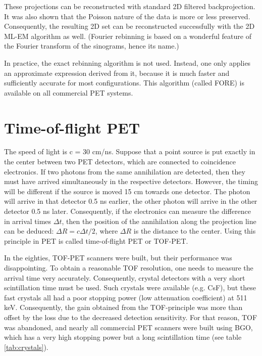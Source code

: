\documentclass[11pt,oneside]{book}
\begin{document}
These projections can be reconstructed with standard 2D filtered
backprojection.  It was also shown that the Poisson nature of the data
is more or less preserved.  Consequently, the resulting 2D set can be
reconstructed successfully with the 2D ML-EM algorithm as
well. (Fourier rebinning is based on a wonderful feature of the
Fourier transform of the sinograms, hence its name.)

In practice, the exact rebinning algorithm is not used. Instead, one
only applies an approximate expression derived from it, because it is
much faster and sufficiently accurate for most configurations. This
algorithm (called FORE) is available on all commercial PET systems.

\section{Time-of-flight PET} \label{sec:TOF}
The speed of light is c = 30 cm/ns. Suppose that a point source is put
exactly in the center between two PET detectors, which are connected
to coincidence electronics. If two photons from the same annihilation
are detected, then they must have arrived simultaneously in the
respective detectors. However, the timing will be different if the
source is moved 15 cm towards one detector. The photon will arrive in
that detector 0.5 ns earlier, the other photon will arrive in the
other detector 0.5 ns later. Consequently, if the electronics can
measure the difference in arrival times $\Delta t$, then the position
of the annihilation along the projection line can be deduced: $\Delta
R = c \Delta t / 2$, where $\Delta R$ is the distance to the
center. Using this principle in PET is called time-of-flight PET or
TOF-PET.

In the eighties, TOF-PET scanners were built, but their performance
was disappointing. To obtain a reasonable TOF resolution, one needs to
measure the arrival time very accurately. Consequently, crystal
detectors with a very short scintillation time must be used. Such
crystals were available (e.g. CsF), but these fast crystals all had a
poor stopping power (low attenuation coefficient) at 511
keV. Consequently, the gain obtained from the TOF-principle was more
than offset by the loss due to the decreased detection
sensitivity. For that reason, TOF was abandoned, and nearly all
commercial PET scanners were built using BGO, which has a very high
stopping power but a long scintillation time (see table
\ref{tab:crystals}).
\end{document}
